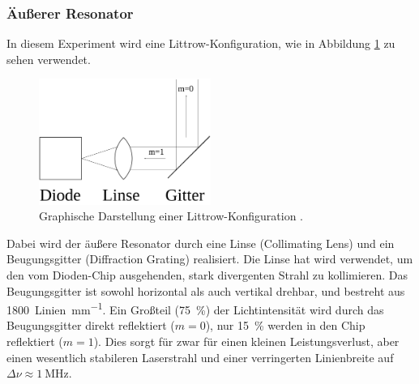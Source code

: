 \subsubsection{Äußerer Resonator}
In diesem Experiment wird eine Littrow-Konfiguration, wie in Abbildung \ref{Littrow}
zu sehen verwendet.
\begin{figure}[htb]
  \centering
  \includegraphics[width=0.5\textwidth]{images/Littrow-Konfig.pdf}
  \caption{Graphische Darstellung einer Littrow-Konfiguration \cite{Littrow-Konfig}.}
  \label{Littrow}
\end{figure}

Dabei wird der äußere Resonator durch eine Linse (Collimating Lens)
und ein Beugungsgitter (Diffraction Grating) realisiert. Die Linse hat wird
verwendet, um den vom Dioden-Chip ausgehenden, stark divergenten Strahl zu
kollimieren. Das Beugungsgitter ist sowohl horizontal als auch vertikal drehbar,
und bestreht aus \SI{1800}{Linien\per\milli\meter}.
Ein Großteil (\SI{75}{\percent}) der Lichtintensität wird durch das Beugungsgitter
direkt reflektiert ($m=\num{0}$), nur \SI{15}{\percent} werden in den Chip reflektiert
($m=\num{1}$). Dies sorgt für zwar für einen kleinen Leistungsverlust, aber einen
wesentlich stabileren Laserstrahl und einer verringerten Linienbreite auf
$\Delta\nu\approx\SI{1}{\mega\hertz}$.


